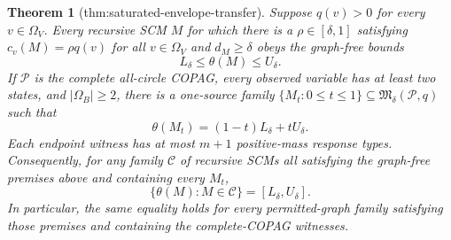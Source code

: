 \documentclass{article}
\newtheorem{theorem}{Theorem}
\begin{document}
\begin{theorem}[thm:saturated-envelope-transfer]\label{thm:saturated-envelope-transfer}
Suppose \(q(v)>0\) for every \(v\in\Omega_V\).  Every recursive SCM \(M\) for which there is a \(\rho\in[\delta,1]\) satisfying \(c_v(M)=\rho q(v)\) for all \(v\in\Omega_V\) and \(d_M\geq\delta\) obeys the graph-free bounds
\[
L_\delta\leq\theta(M)\leq U_\delta.
\]
If \(\mathcal P\) is the complete all-circle COPAG, every observed variable has at least two states, and \(|\Omega_B|\geq2\), there is a one-source family \(\{M_t:0\leq t\leq1\}\subseteq\mathfrak M_\delta(\mathcal P,q)\) such that
\[
\theta(M_t)=(1-t)L_\delta+tU_\delta.
\]
Each endpoint witness has at most \(m+1\) positive-mass response types.  Consequently, for any family \(\mathscr C\) of recursive SCMs all satisfying the graph-free premises above and containing every \(M_t\),
\[
\{\theta(M):M\in\mathscr C\}=[L_\delta,U_\delta].
\]
In particular, the same equality holds for every permitted-graph family satisfying those premises and containing the complete-COPAG witnesses.
\end{theorem}
\end{document}
